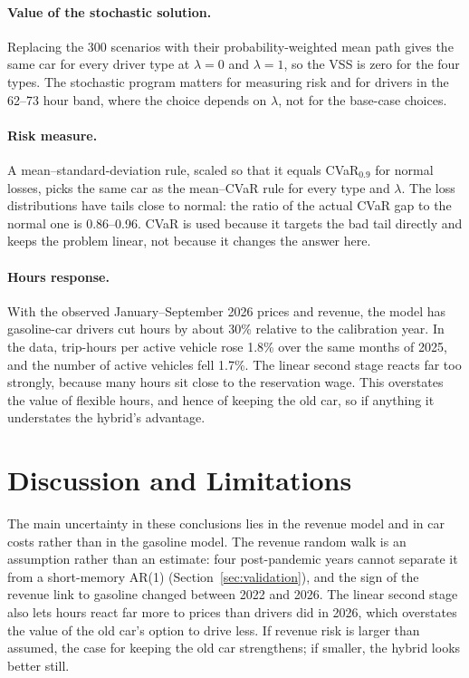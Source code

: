 \documentclass[11pt]{article}
\begin{document}
\paragraph{Value of the stochastic solution.} Replacing the 300 scenarios with their probability-weighted mean path gives the same car for every driver type at $\lambda = 0$ and $\lambda = 1$, so the VSS is zero for the four types. The stochastic program matters for measuring risk and for drivers in the 62--73 hour band, where the choice depends on $\lambda$, not for the base-case choices.

\paragraph{Risk measure.} A mean--standard-deviation rule, scaled so that it equals CVaR$_{0.9}$ for normal losses, picks the same car as the mean--CVaR rule for every type and $\lambda$. The loss distributions have tails close to normal: the ratio of the actual CVaR gap to the normal one is 0.86--0.96. CVaR is used because it targets the bad tail directly and keeps the problem linear, not because it changes the answer here.

\paragraph{Hours response.} With the observed January--September 2026 prices and revenue, the model has gasoline-car drivers cut hours by about 30\% relative to the calibration year. In the data, trip-hours per active vehicle rose 1.8\% over the same months of 2025, and the number of active vehicles fell 1.7\%. The linear second stage reacts far too strongly, because many hours sit close to the reservation wage. This overstates the value of flexible hours, and hence of keeping the old car, so if anything it understates the hybrid's advantage.

\section{Discussion and Limitations}\label{sec:discussion}

The main uncertainty in these conclusions lies in the revenue model and in car costs rather than in the gasoline model. The revenue random walk is an assumption rather than an estimate: four post-pandemic years cannot separate it from a short-memory AR(1) (Section~\ref{sec:validation}), and the sign of the revenue link to gasoline changed between 2022 and 2026. The linear second stage also lets hours react far more to prices than drivers did in 2026, which overstates the value of the old car's option to drive less. If revenue risk is larger than assumed, the case for keeping the old car strengthens; if smaller, the hybrid looks better still.
\end{document}

